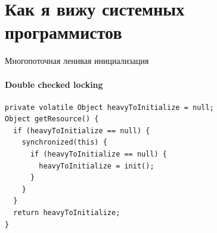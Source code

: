 

\section{Как я вижу системных программистов}
\showTOC





\begin{frame}[fragile]{Многопоточная ленивая инициализация}
\framesubtitle{Double checked locking}

\begin{verbatim}
private volatile Object heavyToInitialize = null;
Object getResource() {
  if (heavyToInitialize == null) {
    synchronized(this) {
      if (heavyToInitialize == null) {
        heavyToInitialize = init();
      }
    }
  }
  return heavyToInitialize;
}
\end{verbatim}

\pause


\pause


\end{frame}


